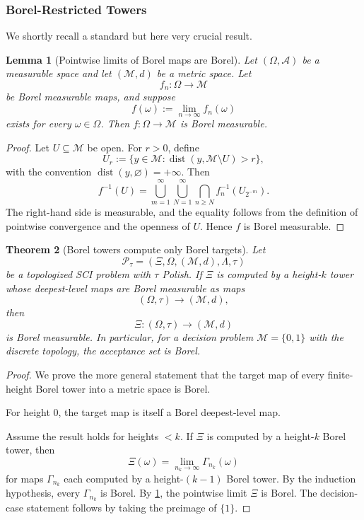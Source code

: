 \documentclass{lmcs} %
\theoremstyle{plain}
\theoremstyle{plain}
\newtheorem{theorem}{Theorem}[section]
\newtheorem{lemma}[theorem]{Lemma}
\theoremstyle{definition}
\theoremstyle{remark}
\theoremstyle{definition}
\theoremstyle{remark}
\numberwithin{equation}{section}
\begin{document}
\subsubsection{Borel-Restricted Towers}

We shortly recall a standard but here very crucial result.

\begin{lemma}[Pointwise limits of Borel maps are Borel]\label{lem:pointwise-limit-borel}
Let \((\Omega,\mathcal A)\) be a measurable space and let \((\mathcal M,d)\) be a metric space.
Let
\[
        f_n:\Omega\to \mathcal M
\]
be Borel measurable maps, and suppose
\[
        f(\omega):=\lim_{n\to\infty}f_n(\omega)
\]
exists for every \(\omega\in\Omega\). Then \(f:\Omega\to \mathcal M\) is Borel measurable.
\end{lemma}

\begin{proof}
Let \(U\subseteq \mathcal M\) be open. For \(r>0\), define
\[
        U_r:=\{y\in \mathcal M:\operatorname{dist}(y, \mathcal M\setminus U)>r\},
\]
with the convention \(\operatorname{dist}(y,\varnothing)=+\infty\). Then
\[
        f^{-1}(U) =
        \bigcup_{m=1}^{\infty}
        \bigcup_{N=1}^{\infty}
        \bigcap_{n\ge N} f_n^{-1}(U_{2^{-m}}).
\]
The right-hand side is measurable, and the equality follows from the definition
of pointwise convergence and the openness of \(U\). Hence \(f\) is Borel measurable.
\end{proof}

\begin{theorem}[Borel towers compute only Borel targets]\label{thm:borelTowersBorelTargets}
Let
\[
\mathcal P_\tau=(\Xi,\Omega,(\mathcal M,d),\Lambda,\tau)
\]
be a topologized SCI problem with \(\tau\) Polish. If \(\Xi\) is computed by a
height-\(k\) tower whose deepest-level maps are Borel measurable as maps
\[
(\Omega,\tau)\to (\mathcal M,d),
\]
then
\[
\Xi:(\Omega,\tau)\to(\mathcal M,d)
\]
is Borel measurable.  In particular, for a decision problem \(\mathcal M=\{0,1\}\) with the
discrete topology, the acceptance set is Borel.
\end{theorem}

\begin{proof}
We prove the more general statement that the target map of every finite-height Borel tower into a metric space is Borel.

For height \(0\), the target map is itself a Borel deepest-level map.

Assume the result holds for heights \(<k\). If \(\Xi\) is computed by a height-\(k\)
Borel tower, then
\[
\Xi(\omega)=\lim_{n_k\to\infty} \Gamma_{n_k}(\omega)
\]
for maps \(\Gamma_{n_k}\) each computed by a height-\((k-1)\) Borel tower. By the
induction hypothesis, every \(\Gamma_{n_k}\) is Borel. By \cref{lem:pointwise-limit-borel}, the pointwise limit \(\Xi\) is Borel.
The decision-case statement follows by taking the preimage of \(\{1\}\).
\end{proof}
\end{document}
